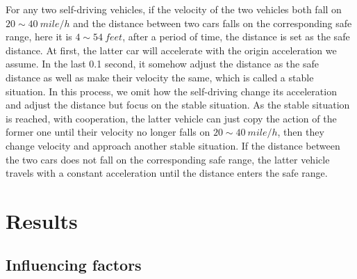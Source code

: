 \documentclass[a4paper]{article}
\begin{document}
\begin{itemize}
		For any two self-driving vehicles, if the velocity of the two vehicles both fall on $ 20\sim 40\  mile/h $ and the distance between two cars falls on the corresponding safe range, here it is $ 4\sim54\  feet$, after a period of time, the distance is set as the safe distance. At first, the latter car will accelerate with the origin acceleration we assume. In the last 0.1 second, it somehow adjust the distance as the safe distance as well as make their velocity the same, which is called a stable situation. In this process, we omit how the self-driving change its acceleration and adjust the distance but focus on the stable situation. As the stable situation is reached, with cooperation, the latter vehicle can just copy the action of the former one until their velocity no longer falls on $ 20\sim 40\  mile/h $, then they change velocity and approach another stable situation. If the distance between the two cars does not fall on the corresponding safe range, the latter vehicle travels with a constant acceleration until the distance enters the safe range.
	\end{itemize}
	
	
	
	\section{Results}
	\subsection{Influencing factors}
	
\end{document}
